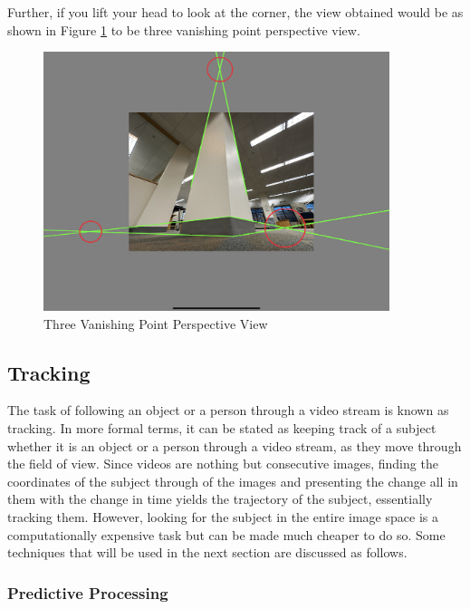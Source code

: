 \documentclass[12pt]{report}
\begin{document}
Further, if you lift your head to look at the corner, the view obtained would be as shown in Figure \ref{fig: Three vanishing point perspective view} to be three vanishing point perspective view.\newline

\begin{figure}[H]
    \centering
    \includegraphics[width=0.9\textwidth]{3vp view.PNG}
    \caption{Three Vanishing Point Perspective View}
    \label{fig: Three vanishing point perspective view}
\end{figure}


\subsection{Tracking}

The task of following an object or a person through a video stream is known as tracking. In more formal terms, it can be stated as keeping track of a subject whether it is an object or a person through a video stream, as they move through the field of view. Since videos are nothing but consecutive images, finding the coordinates of the subject through of the images and presenting the change all in them with the change in time yields the trajectory of the subject, essentially tracking them. However, looking for the subject in the entire image space is a computationally expensive task but can be made much cheaper to do so. Some techniques that will be used in the next section are discussed as follows.

\subsubsection{Predictive Processing}
\end{document}
